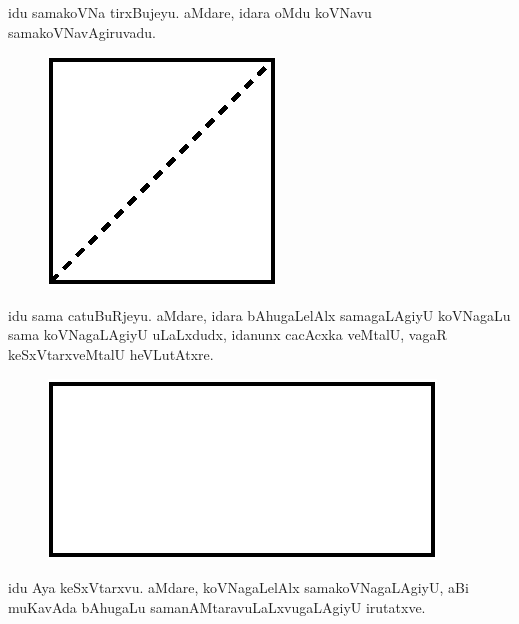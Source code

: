 idu samakoVNa tirxBujeyu. aMdare, idara oMdu koVNavu
samakoVNavAgiruvadu.
\begin{figure}[H]
\centering
\includegraphics[scale=.7]{figure/fig7.eps}
\end{figure}
idu sama catuBuRjeyu. aMdare, idara bAhugaLelAlx samagaLAgiyU
koVNagaLu sama koVNagaLAgiyU uLaLxdudx, idanunx cacAcxka veMtalU,
vagaR keSxVtarxveMtalU heVLutAtxre.
\begin{figure}[H]
\centering
\includegraphics[scale=.75]{figure/fig8.eps}
\end{figure}
idu Aya keSxVtarxvu. aMdare, koVNagaLelAlx samakoVNagaLAgiyU, aBi
muKavAda bAhugaLu samanAMtara\-vuLaLxvugaLAgiyU irutatxve.

\vfill\eject

